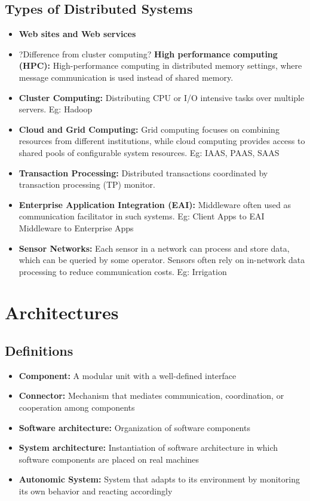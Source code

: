 \documentclass[12pt,titlepage]{article}
\let\stdsection\section
\renewcommand\section{\clearpage\stdsection}
\begin{document}
      \subsection{Types of Distributed Systems}
        \begin{itemize}
          \item \textbf{Web sites and Web services}
          \item ?Difference from cluster computing? \textbf{High performance computing (HPC):} High-performance computing in distributed memory settings, where message communication is used instead of shared memory.
          \item \textbf{Cluster Computing:} Distributing CPU or I/O intensive tasks over multiple servers. Eg: Hadoop
          \item \textbf{Cloud and Grid Computing:} Grid computing focuses on combining resources from different institutions, while cloud computing provides access to shared pools of configurable system resources. Eg: IAAS, PAAS, SAAS
          \item \textbf{Transaction Processing:} Distributed transactions coordinated by transaction processing (TP) monitor.
          \item \textbf{Enterprise Application Integration (EAI):} Middleware often used as communication facilitator in such systems. Eg: Client Apps to EAI Middleware to Enterprise Apps
          \item \textbf{Sensor Networks:} Each sensor in a network can process and store data, which can be queried by some operator. Sensors often rely on in-network data
          processing to reduce communication costs. Eg: Irrigation
        \end{itemize}

  \section{Architectures}
    \subsection{Definitions}
      \begin{itemize}
        \item \textbf{Component:} A modular unit with a well-defined interface
        \item \textbf{Connector:} Mechanism that mediates communication, coordination, or cooperation among components
        \item \textbf{Software architecture:} Organization of software components
        \item \textbf{System architecture:} Instantiation of software architecture in which software components are placed on real machines
        \item \textbf{Autonomic System:} System that adapts to its environment by monitoring its own behavior and reacting accordingly
      \end{itemize}
\end{document}
